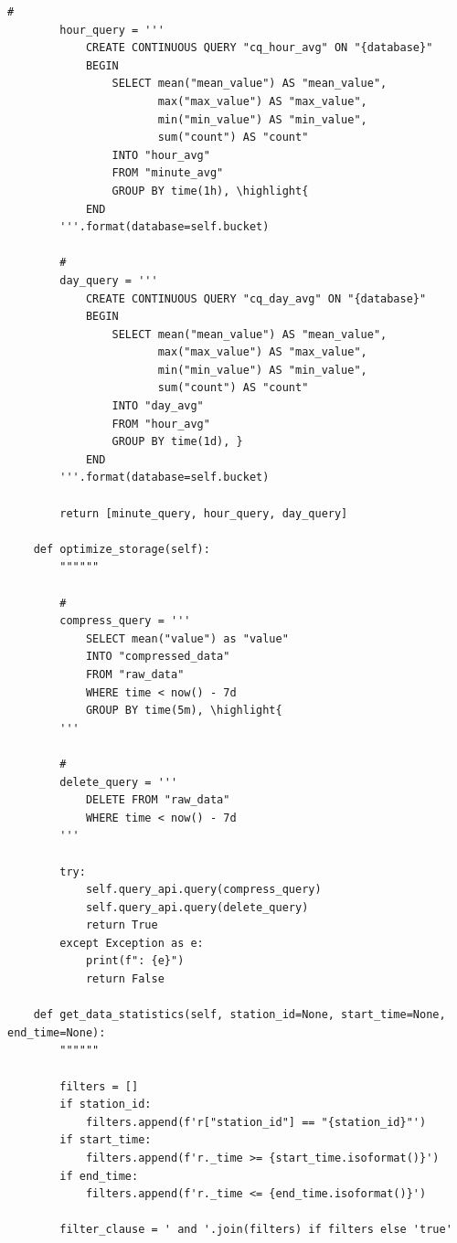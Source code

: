 \begin{lstlisting}[style=python]
        # 
        hour_query = '''
            CREATE CONTINUOUS QUERY "cq_hour_avg" ON "{database}"
            BEGIN
                SELECT mean("mean_value") AS "mean_value",
                       max("max_value") AS "max_value",
                       min("min_value") AS "min_value",
                       sum("count") AS "count"
                INTO "hour_avg"
                FROM "minute_avg"
                GROUP BY time(1h), \highlight{
            END
        '''.format(database=self.bucket)
        
        # 
        day_query = '''
            CREATE CONTINUOUS QUERY "cq_day_avg" ON "{database}"
            BEGIN
                SELECT mean("mean_value") AS "mean_value",
                       max("max_value") AS "max_value",
                       min("min_value") AS "min_value",
                       sum("count") AS "count"
                INTO "day_avg"
                FROM "hour_avg"
                GROUP BY time(1d), }
            END
        '''.format(database=self.bucket)
        
        return [minute_query, hour_query, day_query]
    
    def optimize_storage(self):
        """"""
        
        # 
        compress_query = '''
            SELECT mean("value") as "value"
            INTO "compressed_data"
            FROM "raw_data"
            WHERE time < now() - 7d
            GROUP BY time(5m), \highlight{
        '''
        
        # 
        delete_query = '''
            DELETE FROM "raw_data"
            WHERE time < now() - 7d
        '''
        
        try:
            self.query_api.query(compress_query)
            self.query_api.query(delete_query)
            return True
        except Exception as e:
            print(f": {e}")
            return False
    
    def get_data_statistics(self, station_id=None, start_time=None, end_time=None):
        """"""
        
        filters = []
        if station_id:
            filters.append(f'r["station_id"] == "{station_id}"')
        if start_time:
            filters.append(f'r._time >= {start_time.isoformat()}')
        if end_time:
            filters.append(f'r._time <= {end_time.isoformat()}')
        
        filter_clause = ' and '.join(filters) if filters else 'true'
        

\end{lstlisting}
